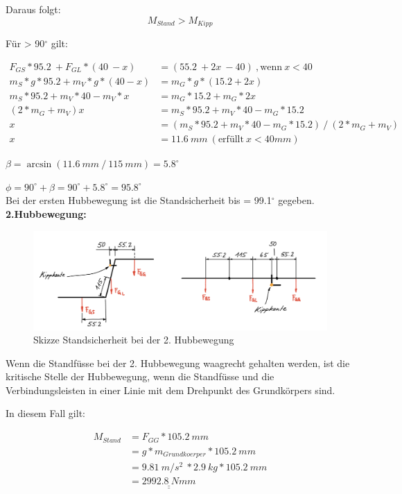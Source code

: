 Daraus folgt:
\[M_{Stand} > M_{Kipp}\]

\newpage
Für {\alpha} > 90$^\circ$ gilt:

\begin{align*}
    F_{GS} * 95.2\ + F_{GL} * (40\ - x) &= (55.2\ + 2x\ - 40)\ ,\text{wenn}\ x < 40 \\
    m_{S} * g * 95.2 + m_{V} * g * (40 - x) &= m_{G} * g * (15.2 + 2x) \\
    m_{S} * 95.2 + m_{V} * 40 - m_{V} * x &= m_{G} * 15.2 + m_{G} * 2x \\
    (2 * m_{G} + m_{V}) x &= m_{S} * 95.2 + m_{V} * 40 - m_{G} * 15.2 \\
    x &= (m_{S} * 95.2 + m_{V} * 40 - m_{G} * 15.2)\ /\ (2 * m_{G} + m_{V}) \\
    x &= 11.6\ mm\ (\text{erfüllt}\ x < 40 mm)
\end{align*}


\({\beta} = \arcsin{(11.6\ mm\ /\ 115\ mm)} = 5.8^{\circ} \)

\({\phi} = 90^{\circ} + {\beta} = 90^{\circ} + 5.8^{\circ} = 95.8^{\circ} \)\\

Bei der ersten Hubbewegung ist die Standsicherheit bis {\phi} = 99.1$^\circ$ gegeben.
\\


\textbf{2.Hubbewegung:}

\begin{figure}[H]
  \includegraphics[width=1\textwidth]{img/Treppensteigen/Standsicherheit 2.Hub.png}
  \centering
  \caption{Skizze Standsicherheit bei der 2. Hubbewegung}
\end{figure}

Wenn die Standfüsse bei der 2. Hubbewegung waagrecht gehalten werden, ist die kritische Stelle der Hubbewegung, wenn die Standfüsse und die Verbindungsleisten in einer Linie mit dem Drehpunkt des Grundkörpers sind.

In diesem Fall gilt:

\begin{align*}
    M_{Stand} &= F_{GG} * 105.2\ mm \\
    &= g * m_{Grundkoerper} * 105.2\ mm \\
    &= 9.81\ m/s^2\ * 2.9\ kg * 105.2\ mm \\
    &= \underline{\underline{2992.8\ Nmm}}
\end{align*}

